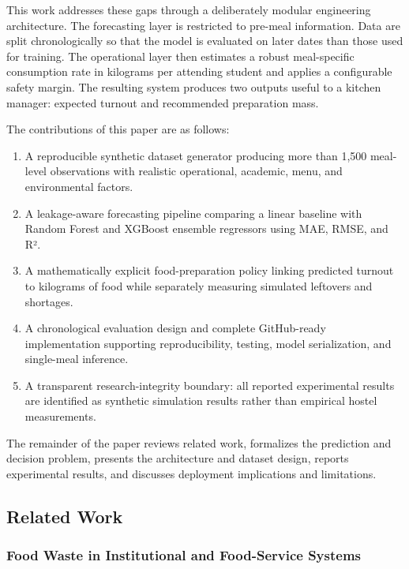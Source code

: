 \documentclass[conference]{IEEEtran}
\providecommand{\tightlist}{\setlength{\itemsep}{0pt}\setlength{\parskip}{0pt}}
\begin{document}
This work addresses these gaps through a deliberately modular
engineering architecture. The forecasting layer is restricted to
pre-meal information. Data are split chronologically so that the model
is evaluated on later dates than those used for training. The
operational layer then estimates a robust meal-specific consumption rate
in kilograms per attending student and applies a configurable safety
margin. The resulting system produces two outputs useful to a kitchen
manager: expected turnout and recommended preparation mass.

The contributions of this paper are as follows:

\begin{enumerate}
\def\labelenumi{\arabic{enumi}.}
\tightlist
\item
  A reproducible synthetic dataset generator producing more than 1,500
  meal-level observations with realistic operational, academic, menu,
  and environmental factors.
\item
  A leakage-aware forecasting pipeline comparing a linear baseline with
  Random Forest and XGBoost ensemble regressors using MAE, RMSE, and R².
\item
  A mathematically explicit food-preparation policy linking predicted
  turnout to kilograms of food while separately measuring simulated
  leftovers and shortages.
\item
  A chronological evaluation design and complete GitHub-ready
  implementation supporting reproducibility, testing, model
  serialization, and single-meal inference.
\item
  A transparent research-integrity boundary: all reported experimental
  results are identified as synthetic simulation results rather than
  empirical hostel measurements.
\end{enumerate}

The remainder of the paper reviews related work, formalizes the
prediction and decision problem, presents the architecture and dataset
design, reports experimental results, and discusses deployment
implications and limitations.

\subsection{Related Work}\label{related-work}

\subsubsection{Food Waste in Institutional and Food-Service
Systems}\label{food-waste-in-institutional-and-food-service-systems}
\end{document}
